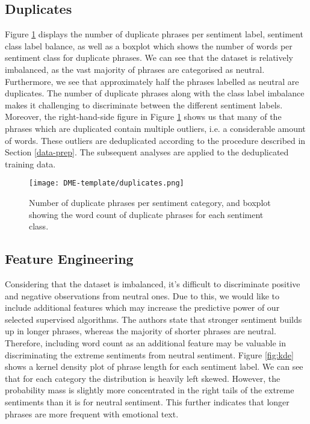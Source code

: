 \documentclass{article}
\begin{document}
\subsection{Duplicates}

Figure \ref{fig:class-balance} displays the number of duplicate phrases per sentiment label, sentiment class label balance, as well as a boxplot which shows the number of words per sentiment class for duplicate phrases. We can see that the dataset is relatively imbalanced, as the vast majority of phrases are categorised as neutral. Furthermore, we see that approximately half the phrases labelled as neutral are duplicates. The number of duplicate phrases along with the class label imbalance makes it challenging to discriminate between the different sentiment labels. Moreover, the right-hand-side figure in Figure \ref{fig:class-balance} shows us that many of the phrases which are duplicated contain multiple outliers, i.e. a considerable amount of words. These outliers are deduplicated according to the procedure described in Section \ref{data-prep}. The subsequent analyses are applied to the deduplicated training data. 

\begin{figure}[h]
    \centering
    \texttt{[image: DME-template/duplicates.png]}
    \caption{Number of duplicate phrases per sentiment category, and boxplot showing the word count of duplicate phrases for each sentiment class.}
    \label{fig:class-balance}
\end{figure} 

\subsection{Feature Engineering}

Considering that the dataset is imbalanced, it's difficult to discriminate positive and negative observations from neutral ones. Due to this, we would like to include additional features which may increase the predictive power of our selected supervised algorithms. The authors \cite{socher-etal-2013-recursive} state that stronger sentiment builds up in longer phrases, whereas the majority of shorter phrases are neutral. Therefore, including word count as an additional feature may be valuable in discriminating the extreme sentiments from neutral sentiment. Figure \ref{fig:kde} shows a kernel density plot of phrase length for each sentiment label. We can see that for each category the distribution is heavily left skewed. However, the probability mass is slightly more concentrated in the right tails of the extreme sentiments than it is for neutral sentiment. This further indicates that longer phrases are more frequent with emotional text. 
\end{document}
